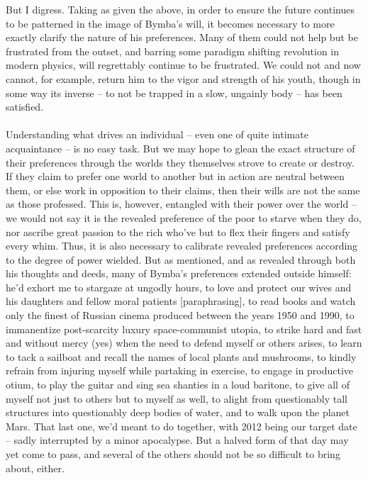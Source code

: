 \documentclass[twoside,10pt]{article}
\begin{document}
\begin{article*}
But I digress. Taking as given the above, in order to ensure the future continues to be patterned in the image of Bymba’s will, it becomes necessary to more exactly clarify the nature of his preferences. Many of them could not help but be frustrated from the outset, and barring some paradigm shifting revolution in modern physics, will regrettably continue to be frustrated.  We could not and now cannot, for example, return him to the vigor and strength of his youth, though in some way its inverse – to not be trapped in a slow, ungainly body – has been satisfied. 
\\\\
Understanding what drives an individual – even one of quite intimate acquaintance – is no easy task. But we may hope to glean the exact structure of their preferences through the worlds they themselves strove to create or destroy. If they claim to prefer one world to another but in action are neutral between them, or else work in opposition to their claims, then their wills are not the same as those professed. This is, however, entangled with their power over the world – we would not say it is the revealed preference of the poor to starve when they do, nor ascribe great passion to the rich who’ve but to flex their fingers and satisfy every whim. Thus, it is also necessary to calibrate revealed preferences according to the degree of power wielded. But as mentioned, and as revealed through both his thoughts and deeds, many of Bymba’s preferences extended outside himself: he’d exhort me to stargaze at ungodly hours, to love and protect our wives and his daughters and fellow moral patients [paraphrasing], to read books and watch only the finest of Russian cinema produced between the years 1950 and 1990, to immanentize post-scarcity luxury space-communist utopia, to strike hard and fast and without mercy (yes) when the need to defend myself or others arises, to learn to tack a sailboat and recall the names of local plants and mushrooms, to kindly refrain from injuring myself while partaking in exercise, to engage in productive otium, to play the guitar and sing sea shanties in a loud baritone, to give all of myself not just to others but to myself as well, to alight from questionably tall structures into questionably deep bodies of water, and to walk upon the planet Mars. That last one, we’d meant to do together, with 2012 being our target date – sadly interrupted by a minor apocalypse. But a halved form of that day may yet come to pass, and several of the others should not be so difficult to bring about, either.
\\\\

\end{article*}
\end{document}
